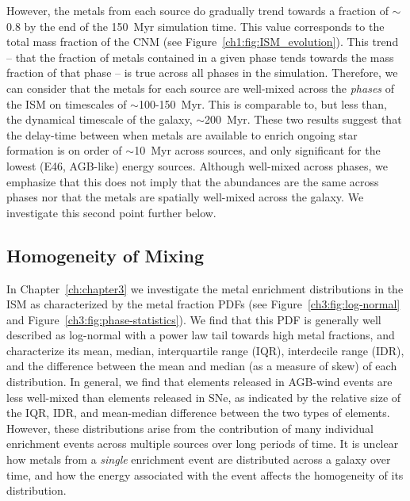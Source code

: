 However, the metals from each source do gradually trend towards a fraction of $\sim$0.8 by the end of the 150~Myr simulation time. This value corresponds to the total mass fraction of the CNM (see Figure~\ref{ch1:fig:ISM_evolution}). This trend -- that the fraction of metals contained in a given phase tends towards the mass fraction of that phase -- is true across all phases in the simulation. Therefore, we can consider that the metals for each source are well-mixed across the \textit{phases} of the ISM on timescales of $\sim$100-150~Myr. This is comparable to, but less than, the dynamical timescale of the galaxy, $\sim$200~Myr. These two results suggest that the delay-time between when metals are available to enrich ongoing star formation is on order of $\sim$10~Myr across sources, and only significant for the lowest (E46, AGB-like) energy sources. Although well-mixed across phases, we emphasize that this does not imply that the abundances are the same across phases nor that the metals are spatially well-mixed across the galaxy. We investigate this second point further below.

\subsection{Homogeneity of Mixing}
\label{ch4:sec:spreads}

In Chapter~\ref{ch:chapter3} we investigate the metal enrichment distributions in the ISM as characterized by the metal fraction PDFs (see Figure~\ref{ch3:fig:log-normal} and Figure~\ref{ch3:fig:phase-statistics}). We find that this PDF is generally well described as log-normal with a power law tail towards high metal fractions, and characterize its mean, median, interquartile range (IQR), interdecile range (IDR), and the difference between the mean and median (as a measure of skew) of each distribution. In general, we find that elements released in AGB-wind events are less well-mixed than elements released in SNe, as indicated by the relative size of the IQR, IDR, and mean-median difference between the two types of elements. However, these distributions arise from the contribution of many individual enrichment events across multiple sources over long periods of time. It is unclear how metals from a \textit{single} enrichment event are distributed across a galaxy over time, and how the energy associated with the event affects the homogeneity of its distribution.

